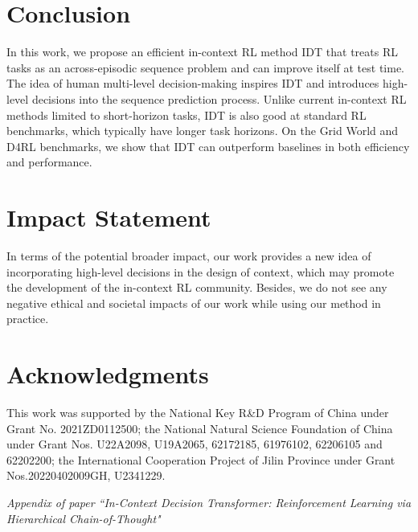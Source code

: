 \documentclass{article}
\theoremstyle{plain}
\theoremstyle{definition}
\theoremstyle{remark}
\begin{document}
\section{Conclusion}
In this work, we propose an efficient in-context RL method IDT that treats RL tasks as an across-episodic sequence problem and can improve itself at test time. The idea of human multi-level decision-making inspires IDT and introduces high-level decisions into the sequence prediction process. Unlike current in-context RL methods limited to short-horizon tasks, IDT is also good at standard RL benchmarks, which typically have longer task horizons. On the Grid World and D4RL benchmarks, we show that IDT can outperform baselines in both efficiency and performance.
\section*{Impact Statement}
In terms of the potential broader impact, our work provides a new idea of incorporating high-level decisions in the design of context, which may promote the development of the in-context RL community.
Besides, we do not see any negative ethical and societal impacts of our work while using our method in practice.
\section*{Acknowledgments}
This work was supported by the National Key R\&D Program of China under Grant No. 2021ZD0112500; the National Natural Science Foundation of China under Grant Nos. U22A2098, U19A2065, 62172185, 61976102, 62206105 and 62202200; the International Cooperation Project of Jilin Province under Grant Nos.20220402009GH, U2341229.


\newpage
\appendix
\onecolumn
\large
\begin{center}
   \emph{Appendix of paper ``In-Context Decision Transformer: Reinforcement Learning via Hierarchical Chain-of-Thought"}
\end{center}
\normalsize
\end{document}

